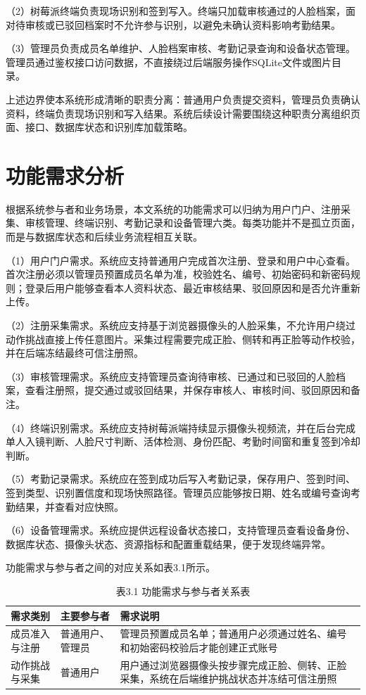 \documentclass[UTF8]{heuthesis}
\begin{document}
（2）树莓派终端负责现场识别和签到写入。终端只加载审核通过的人脸档案，面对待审核或已驳回档案时不允许参与识别，以避免未确认资料影响考勤结果。

（3）管理员负责成员名单维护、人脸档案审核、考勤记录查询和设备状态管理。管理员通过鉴权接口访问数据，不直接绕过后端服务操作SQLite文件或图片目录。

上述边界使本系统形成清晰的职责分离：普通用户负责提交资料，管理员负责确认资料，终端负责现场识别和写入结果。系统后续设计需要围绕这种职责分离组织页面、接口、数据库状态和识别库加载策略。

\section{功能需求分析}
根据系统参与者和业务场景，本文系统的功能需求可以归纳为用户门户、注册采集、审核管理、终端识别、考勤记录和设备管理六类。每类功能并不是孤立页面，而是与数据库状态和后续业务流程相互关联。

（1）用户门户需求。系统应支持普通用户完成首次注册、登录和用户中心查看。首次注册必须以管理员预置成员名单为准，校验姓名、编号、初始密码和新密码规则；登录后用户能够查看本人资料状态、最近审核结果、驳回原因和是否允许重新上传。

（2）注册采集需求。系统应支持基于浏览器摄像头的人脸采集，不允许用户绕过动作挑战直接上传任意图片。采集过程需要完成正脸、侧转和再正脸等动作校验，并在后端冻结最终可信注册照。

（3）审核管理需求。系统应支持管理员查询待审核、已通过和已驳回的人脸档案，查看注册照，提交通过或驳回结果，并保存审核人、审核时间、驳回原因和备注。

（4）终端识别需求。系统应支持树莓派端持续显示摄像头视频流，并在后台完成单人入镜判断、人脸尺寸判断、活体检测、身份匹配、考勤时间窗和重复签到冷却判断。

（5）考勤记录需求。系统应在签到成功后写入考勤记录，保存用户、签到时间、签到类型、识别置信度和现场快照路径。管理员应能够按日期、姓名或编号查询考勤结果，并查看对应快照。

（6）设备管理需求。系统应提供远程设备状态接口，支持管理员查看设备身份、数据库状态、摄像头状态、资源指标和配置重载结果，便于发现终端异常。

功能需求与参与者之间的对应关系如表3.1所示。

\begingroup
\small
\begin{longtable}{|>{\raggedright\arraybackslash}p{}|>{\raggedright\arraybackslash}p{}|>{\raggedright\arraybackslash}p{}|}
\caption{表3.1 功能需求与参与者关系表}\\
\hline
需求类别 & 主要参与者 & 需求说明 \\
\hline
成员准入与注册 & 普通用户、管理员 & 管理员预置成员名单；普通用户必须通过姓名、编号和初始密码校验后才能创建正式账号 \\
\hline
动作挑战与采集 & 普通用户 & 用户通过浏览器摄像头按步骤完成正脸、侧转、正脸采集，系统在后端维护挑战状态并冻结可信注册照 \\
\hline
\end{longtable}
\endgroup
\end{document}
